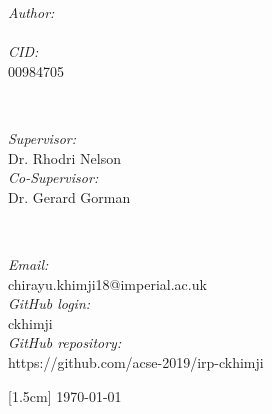 \begin{titlepage}
\begin{minipage}{0.4\textwidth}
\begin{flushleft} \large
\emph{Author:}\\
\@author %
\\[1.2em]
\emph{CID:}\\
00984705
\end{flushleft}
\end{minipage}
~
\begin{minipage}{0.4\textwidth}
\begin{flushright} \large
\emph{Supervisor:} \\
Dr. Rhodri Nelson
\\[1.2em] 
\emph{Co-Supervisor:} \\
Dr. Gerard Gorman%
\end{flushright}
\end{minipage}\\[2.5cm]
\makeatother


\begin{flushleft}
\emph{Email:}\\
chirayu.khimji18@imperial.ac.uk
\\[1.2em]
\emph{GitHub login:}\\
ckhimji
\\[1.2em]
\emph{GitHub repository:}\\
https://github.com/acse-2019/irp-ckhimji
\end{flushleft}[1.5cm]
{\large \today}\\[2cm] %

\vfill %

\end{titlepage}